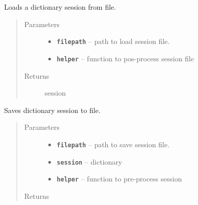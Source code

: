 \documentclass[letterpaper,10pt,english]{sphinxmanual}
\begin{document}

\begin{fulllineitems}
\label{RRtoolbox.lib:RRtoolbox.lib.session.readSession}
Loads a dictionary session from file.
\begin{quote}\begin{description}
\item[{Parameters}] \leavevmode\begin{itemize}
\item {} 
\textbf{\texttt{filepath}} -- path to load session file.

\item {} 
\textbf{\texttt{helper}} -- function to pos-process session file

\end{itemize}

\item[{Returns}] \leavevmode
session

\end{description}\end{quote}

\end{fulllineitems}


\begin{fulllineitems}
\label{RRtoolbox.lib:RRtoolbox.lib.session.saveSession}
Saves dictionary session to file.
\begin{quote}\begin{description}
\item[{Parameters}] \leavevmode\begin{itemize}
\item {} 
\textbf{\texttt{filepath}} -- path to save session file.

\item {} 
\textbf{\texttt{session}} -- dictionary

\item {} 
\textbf{\texttt{helper}} -- function to pre-process session

\end{itemize}

\item[{Returns}] \leavevmode


\end{description}\end{quote}

\end{fulllineitems}
\end{document}
